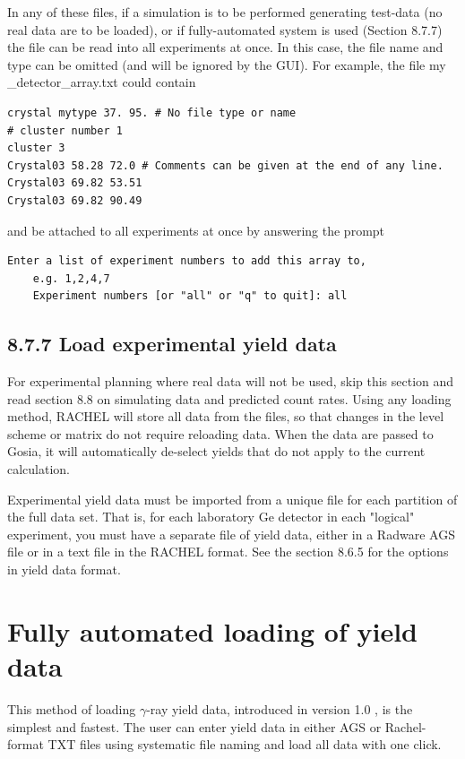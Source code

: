 \documentclass[10pt]{article}
\begin{document}
In any of these files, if a simulation is to be performed generating test-data (no real data are to be loaded), or if fully-automated system is used (Section 8.7.7) the file can be read into all experiments at once. In this case, the file name and type can be omitted (and will be ignored by the GUI). For example, the file my \_detector\_array.txt could contain

\begin{verbatim}
crystal mytype 37. 95. # No file type or name
# cluster number 1
cluster 3
Crystal03 58.28 72.0 # Comments can be given at the end of any line.
Crystal03 69.82 53.51
Crystal03 69.82 90.49
\end{verbatim}

and be attached to all experiments at once by answering the prompt

\begin{verbatim}
Enter a list of experiment numbers to add this array to,
    e.g. 1,2,4,7
    Experiment numbers [or "all" or "q" to quit]: all
\end{verbatim}

\subsection*{8.7.7 Load experimental yield data}
For experimental planning where real data will not be used, skip this section and read section 8.8 on simulating data and predicted count rates. Using any loading method, RACHEL will store all data from the files, so that changes in the level scheme or matrix do not require reloading data. When the data are passed to Gosia, it will automatically de-select yields that do not apply to the current calculation.

Experimental yield data must be imported from a unique file for each partition of the full data set. That is, for each laboratory Ge detector in each "logical" experiment, you must have a separate file of yield data, either in a Radware AGS file or in a text file in the RACHEL format. See the section 8.6.5 for the options in yield data format.

\section*{Fully automated loading of yield data}
This method of loading $\gamma$-ray yield data, introduced in version 1.0 , is the simplest and fastest. The user can enter yield data in either AGS or Rachel-format TXT files using systematic file naming and load all data with one click.
\end{document}
